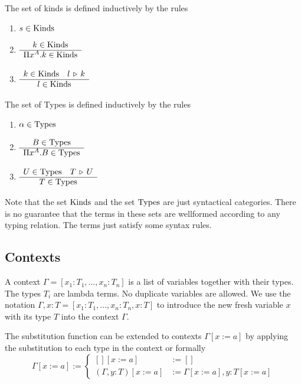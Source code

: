 \documentclass[12pt]{article}
\begin{document}
\begin{definition}
  The set of kinds is defined inductively by the rules
  \begin{enumerate}

  \item $s \in \text{Kinds}$

  \item $\begin{array}{c} k \in \text{Kinds} \\ \hline \Pi x^A.k \in \text{Kinds}\end{array}$

  \item $\begin{array}{c} k \in \text{Kinds} \quad l \,\triangleright\, k \\ \hline l \in \text{Kinds}\end{array}$
  \end{enumerate}

\end{definition}



\begin{definition}
  The set of Types is defined inductively by the rules
  \begin{enumerate}

  \item $\alpha \in \text{Types}$

  \item $\begin{array}{c} B \in \text{Types} \\ \hline \Pi x^A.B \in \text{Types}\end{array}$

  \item $\begin{array}{c} U \in \text{Types} \quad T \,\triangleright\, U \\ \hline T \in \text{Types}\end{array}$
  \end{enumerate}

\end{definition}

Note that the set $\text{Kinds}$ and the set $\text{Types}$ are just syntactical
categories. There is no guarantee that the terms in these sets are wellformed
according to any typing relation. The terms just satisfy some syntax rules.


\subsection{Contexts}

\begin{definition}
  A context $\Gamma = [x_1:T_1, \ldots, x_n:T_n]$ is a list of variables
  together with their types. The types $T_i$ are lambda terms. No duplicate
  variables are allowed. We use the notation
  $\Gamma,x:T = [x_1:T_1, \ldots, x_n:T_n, x:T]$ to introduce the new fresh
  variable $x$ with its type $T$ into the context $\Gamma$.
\end{definition}

The substitution function can be extended to contexts $\Gamma[x:=a]$ by
applying the substitution to each type in the context or formally
$$
\Gamma[x:=a] :=
\begin{cases}
  [][x:=a] &:= []
  \\
  (\Gamma,y:T)[x:=a] &:= \Gamma[x:=a],y:T[x:=a]
\end{cases}
$$
\end{document}
